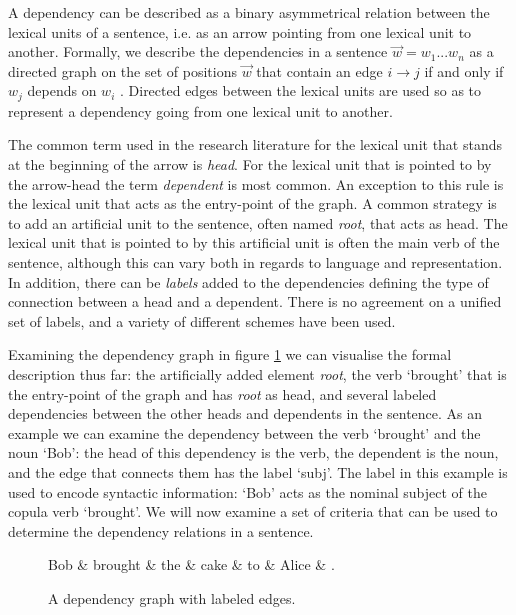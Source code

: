 A dependency can be described as a binary asymmetrical relation between the lexical units of a sentence, i.e. as an arrow pointing from one lexical unit to another. Formally, we describe the dependencies in a sentence $\vec{w} = w_1 ... w_n$ as a directed graph on the set of positions $\vec{w}$ that contain an edge $i \rightarrow j$ if and only if $w_j$ depends on $w_i$ \cite{Kuhl:10}. Directed edges between the lexical units are used so as to represent a dependency going from one lexical unit to another.

The common term used in the research literature for the lexical unit that stands at the beginning of the arrow is \textit{head}. For the lexical unit that is pointed to by the arrow-head the term \textit{dependent} is most common. An exception to this rule is the lexical unit that acts as the entry-point of the graph. A common strategy is to add an artificial unit to the sentence, often named \textit{root}, that acts as head. The lexical unit that is pointed to by this artificial unit is often the main verb of the sentence, although this can vary both in regards to language and representation. In addition, there can be \textit{labels} added to the dependencies defining the type of connection between a head and a dependent. There is no agreement on a unified set of labels, and a variety of different schemes have been used.

Examining the dependency graph in figure \ref{dep1} we can visualise the formal description thus far: the artificially added element \textit{root}, the verb `brought' that is the entry-point of the graph and has \textit{root} as head, and several labeled dependencies between the other heads and dependents in the sentence. As an example we can examine the dependency between the verb `brought' and the noun `Bob': the head of this dependency is the verb, the dependent is the noun, and the edge that connects them has the label `subj'. The label in this example is used to encode syntactic information: `Bob' acts as the nominal subject of the copula verb `brought'. We will now examine a set of criteria that can be used to determine the dependency relations in a sentence.

\begin{figure}
    \begin{dependency}[]
        \begin{deptext}[column sep=1em, row sep=.1ex]
            Bob \& brought \& the \& cake \& to \& Alice \& . \\
        \end{deptext}
    \end{dependency}
    \caption{A dependency graph with labeled edges.}
    \label{dep1}
\end{figure}

